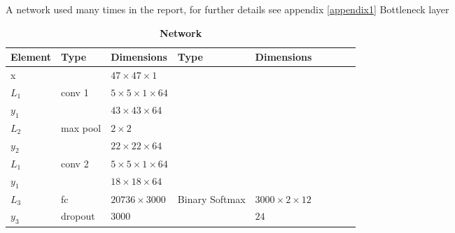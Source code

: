 \begin{table}[h!]
{		\caption{A network used many times in the report, for further details see appendix \ref{appendix1} \label{tab:net2}
			\newline *Bottleneck layer}
	}
\end{table}

\begin{table}[h!]
	\centering
	\caption*{\textbf{Network \networkIII}}
	{\footnotesize
		\begin{tabular}{|lllllllll|}
			\hline
			\multicolumn{1}{|l|}{Element} & Type             & \multicolumn{1}{l|}{Dimensions}                  & Type           & \multicolumn{1}{l|}{Dimensions}            \\ \hline
			\multicolumn{1}{|l|}{x}       &                  & \multicolumn{1}{l|}{$47\times47\times1$}         &                & \multicolumn{1}{l|}{}                      \\ \hline

			\multicolumn{1}{|l|}{$L_1$}   & conv 1           & \multicolumn{1}{l|}{$5\times 5\times1\times 64$} &                & \multicolumn{1}{l|}{}                      \\
			\multicolumn{1}{|l|}{$y_1$}   &                  & \multicolumn{1}{l|}{$43\times43\times64$}        &                & \multicolumn{1}{l|}{}                      \\ \hline

			\multicolumn{1}{|l|}{$L_2$}   & max pool         & \multicolumn{1}{l|}{$2\times 2$}                 &                & \multicolumn{1}{l|}{}                      \\
			\multicolumn{1}{|l|}{$y_2$}   &                  & \multicolumn{1}{l|}{$22\times22\times 64$}       &                & \multicolumn{1}{l|}{}                      \\ \hline

			\multicolumn{1}{|l|}{$L_1$}   & conv 2           & \multicolumn{1}{l|}{$5\times 5\times1\times 64$} &                & \multicolumn{1}{l|}{}                      \\
			\multicolumn{1}{|l|}{$y_1$}   &                  & \multicolumn{1}{l|}{$18\times18\times64$}        &                & \multicolumn{1}{l|}{}                      \\ \hline

			\multicolumn{1}{|l|}{$L_3$}   & fc               & \multicolumn{1}{l|}{$20736\times3000$}           & Binary Softmax & \multicolumn{1}{l|}{$3000\times2\times12$} \\
			\multicolumn{1}{|l|}{$y_3$}   & dropout          & \multicolumn{1}{l|}{$3000$}                      &                & \multicolumn{1}{l|}{$24$}                  \\ \hline


\end{tabular}}
\end{table}
